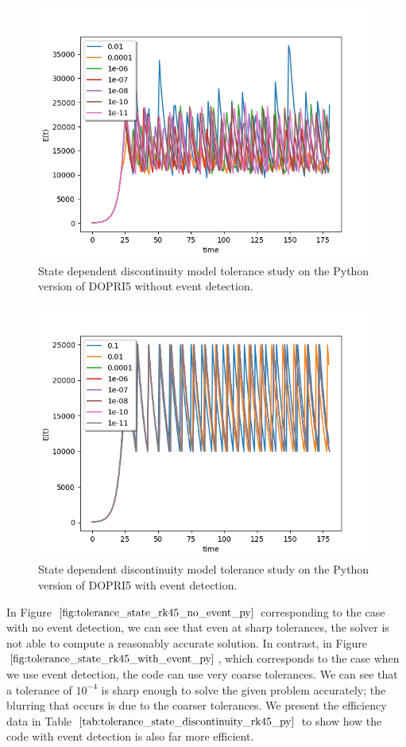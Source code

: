 \begin{figure}[h]
\centering
\includegraphics[width=0.7\linewidth]{./figures/tolerance_state_rk45_no_event_py}
\caption{State dependent discontinuity model tolerance study on the Python version of DOPRI5 without event detection.}
\label{fig:tolerance_state_rk45_no_event_py}
\end{figure}

\begin{figure}[h]
\centering
\includegraphics[width=0.7\linewidth]{./figures/tolerance_state_rk45_with_event_py}
\caption{State dependent discontinuity model tolerance study on the Python version of DOPRI5 with event detection.}
\label{fig:tolerance_state_rk45_with_event_py}
\end{figure}

In Figure $\ref{fig:tolerance_state_rk45_no_event_py}$ corresponding to the case with no event detection, we can see that even at sharp tolerances, the solver is not able to compute a reasonably accurate solution. In contrast, in Figure $\ref{fig:tolerance_state_rk45_with_event_py}$, which corresponds to the case when we use event detection, the code can use very coarse tolerances. We can see that a tolerance of $10^{-4}$ is sharp enough to solve the given problem accurately; the blurring that occurs is due to the coarser tolerances. We present the efficiency data in Table $\ref{tab:tolerance_state_discontinuity_rk45_py}$ to show how the code with event detection is also far more efficient.

